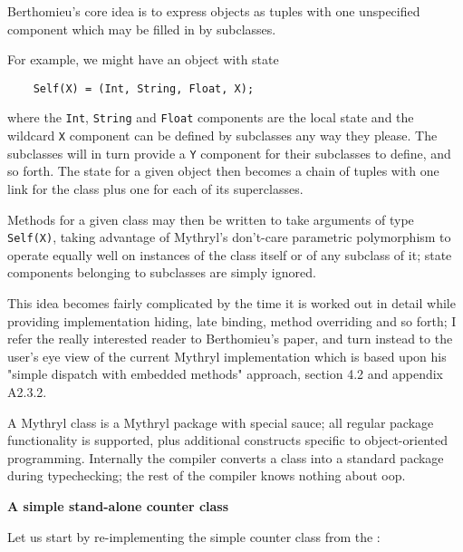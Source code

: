 Berthomieu's core idea is to express objects as tuples with one unspecified 
component which may be filled in by subclasses.

For example, we might have an object with state

\begin{verbatim}
    Self(X) = (Int, String, Float, X);
\end{verbatim}

where the {\tt Int}, {\tt String} and {\tt Float} components are the local 
state and the wildcard {\tt X} component can be defined by subclasses any way they 
please.  The subclasses will in turn provide a {\tt Y} component for their 
subclasses to define, and so forth.  The state for a given object then 
becomes a chain of tuples with one link for the class plus one for each 
of its superclasses.

Methods for a given class may then be written to take arguments of type 
{\tt Self(X)}, taking advantage of Mythryl's don't-care parametric polymorphism 
to operate equally well on instances of the class itself or of any subclass 
of it; state components belonging to subclasses are simply ignored.

This idea becomes fairly complicated by the time it is worked out in 
detail while providing implementation hiding, late binding, method 
overriding and so forth;  I refer the really interested reader to Berthomieu's 
paper, and turn instead to the user's eye view of the current Mythryl implementation 
which is based upon his "simple dispatch with embedded methods" approach, section 
4.2 and appendix A2.3.2.

A Mythryl class is a Mythryl package with special sauce;  all regular package 
functionality is supported, plus additional constructs specific to object-oriented 
programming.  Internally the compiler converts a class into a standard package during 
typechecking; the rest of the compiler knows nothing about oop.

{\bf A simple stand-alone counter class}

Let us start by re-implementing the simple counter class from the 
:

